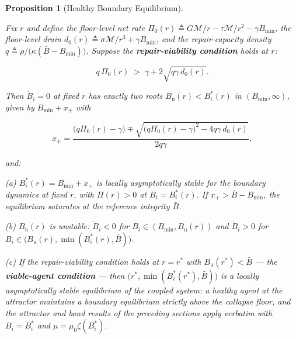 \documentclass[11pt]{article}
\theoremstyle{plain}
\newtheorem{proposition}[theorem]{Proposition}
\theoremstyle{definition}
\theoremstyle{remark}
\begin{document}
\begin{proposition}[Healthy Boundary Equilibrium]
\label{prop-healthy-boundary-equilibrium}

Fix $r$ and define the floor-level net rate $\Pi_0(r) \triangleq G\mathcal{M}/r - \tau\mathcal{M}/r^2 - \gamma B_{\min}$, the floor-level drain $d_0(r) \triangleq \sigma\mathcal{M}/r^3 + \gamma B_{\min}$, and the repair-capacity density $q \triangleq \rho / \bigl(\kappa(\bar{B} - B_{\min})\bigr)$. Suppose the \textbf{repair-viability condition} holds at $r$:

$$q\, \Pi_0(r) \;>\; \gamma + 2\sqrt{q \gamma\, d_0(r)}.$$

Then $\dot{B}_i = 0$ at fixed $r$ has exactly two roots $B_{\mathrm{u}}(r) < B_i^*(r)$ in $(B_{\min}, \infty)$, given by $B_{\min} + x_\mp$ with

$$x_\mp = \frac{\bigl(q \Pi_0(r) - \gamma\bigr) \mp \sqrt{\bigl(q \Pi_0(r) - \gamma\bigr)^2 - 4 q \gamma\, d_0(r)}}{2 q \gamma},$$

and:

(a) $B_i^*(r) = B_{\min} + x_+$ is locally asymptotically stable for the boundary dynamics at fixed $r$, with $\Pi(r) > 0$ at $B_i = B_i^*(r)$. If $x_+ > \bar{B} - B_{\min}$, the equilibrium saturates at the reference integrity $\bar{B}$.

(b) $B_{\mathrm{u}}(r)$ is unstable: $\dot{B}_i < 0$ for $B_i \in (B_{\min}, B_{\mathrm{u}}(r))$ and $\dot{B}_i > 0$ for $B_i \in \bigl(B_{\mathrm{u}}(r), \min(B_i^*(r), \bar{B})\bigr)$.

(c) If the repair-viability condition holds at $r = r^*$ with $B_{\mathrm{u}}(r^*) < \bar{B}$ — the \textbf{viable-agent condition} — then $\bigl(r^*, \min(B_i^*(r^*), \bar{B})\bigr)$ is a locally asymptotically stable equilibrium of the coupled system: a healthy agent at the attractor maintains a boundary equilibrium strictly above the collapse floor, and the attractor and band results of the preceding sections apply verbatim with $B_i = B_i^*$ and $\mu = \mu_0 \zeta(B_i^*)$.
\end{proposition}
\end{document}
